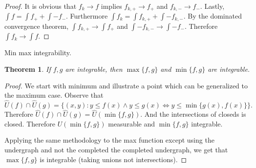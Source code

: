 \documentclass[letter]{article}
\newtheorem{theorem}{Theorem}
\newenvironment{menumerate}{%
  \edef\backupindent{\the\parindent}%
  \enumerate%
  \setlength{\parindent}{\backupindent}%
}{\endenumerate}
\begin{document}
\begin{menumerate}
\begin{proof}
        It is obvious that $f_k \to f$ implies $f_{k,+} \to f_+$ and $f_{k,-} \to f_-$. Lastly,
        $\int f = \int f_+ + \int -f_-.$ Furthermore $\int f_k = \int f_{k,+} + \int -f_{k,-}.$ 
        By the dominated convergence theorem, $\int f_{k,+} \to \int f_+$ and $\int -f_{k,-} \to \int -f_-$.
        Therefore $\int f_k \to \int f$.  
     \end{proof}
     \item Min max integrability.
     \begin{theorem}
        If $f,g$ are integrable, then $\max \{f,g\}$ and $\min \{f,g\}$ are integrable. 
     \end{theorem}
     \begin{proof}
        We start with minimum and illustrate a point which can be generalized to the maximum case.
        Observe that 
        \begin{equation}
            \hat U(f) \cap \hat U(g) =  \{(x,y) :y \leq f(x) \wedge y \leq g(x) \iff y \leq \min\{g(x), f(x)\}\}.
            \end{equation}    
        Therefore $\hat U(f) \cap \hat U(g) = \hat U(\min\{f,g\}).$ And the intersections of closeds is closed. Therefore $U( \min\{f,g\})$ measurable and $\min\{f,g\}$ integrable.

        Applying the same methodology to the max function except using the undergraph and not the completed the completed undergraph, we get that $\max \{f,g\}$ is integrable (taking unions not intersections).
     \end{proof}

\end{menumerate}
\end{document}
